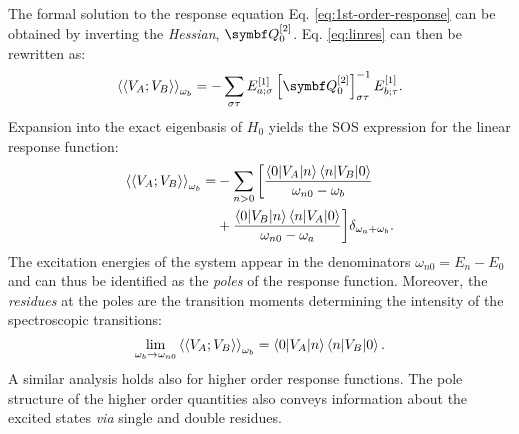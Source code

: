 The formal solution to the response equation Eq.
\eqref{eq:1st-order-response} can be obtained by inverting the
\emph{Hessian}, $\mat{Q}_0^{[2]}$. Eq. \eqref{eq:linres} can then be rewritten as:
\begin{equation}
  \response{V_A}{V_B}{\omega_b}
  =
   -\sum_{\sigma\tau}
   E^{[1]}_{a;\sigma}
   \left[\mat{Q}^{[2]}_{0}\right]^{-1}_{\sigma\tau}
   E^{[1]}_{b;\tau}.
\end{equation}
Expansion into the exact eigenbasis of $H_0$ yields the
\gls{SOS} expression for the linear response function:
\begin{equation}
  \begin{aligned}
  \braket{\braket{V_A; V_B}}_{\omega_b}
  =
  &-\sum_{n>0}
  \bigg[
  \frac{\braket{0|V_A|n}\braket{n|V_B|0}}{\omega_{n0}-\omega_b} \\
  &+
  \frac{\braket{0|V_B|n}\braket{n|V_A|0}}{\omega_{n0}-\omega_a}
  \bigg]
  \delta_{\omega_a+\omega_b}.
\end{aligned}
\end{equation}
The excitation energies of the system appear in the denominators
$\omega_{n0} = E_n - E_0$ and can thus be identified as the \emph{poles}
of the response function. Moreover, the \emph{residues} at
the poles are the transition moments determining the intensity of
the spectroscopic transitions:
\begin{equation}
  \lim_{\omega_b\rightarrow\omega_{n0}}
  \braket{\braket{V_A; V_B}}_{\omega_b}
  = \braket{0|V_A|n}\braket{n|V_B|0}.
\end{equation}
A similar analysis holds also for higher order response functions. The
pole structure of the higher order quantities also conveys information
about the excited states \emph{via} single and double
residues.\autocite{Olsen1985-nr, Christiansen1998-pe, Helgaker2012-cz}

